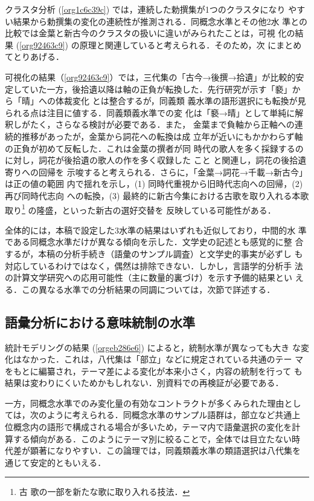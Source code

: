 \documentclass[submit]{ipsj}
\renewcommand{\ref}{\cref}
\begin{document}
クラスタ分析 (\ref{org1c6c39c}) では，連続した勅撰集が1つのクラスタになり
やすい結果から勅撰集の変化の連続性が推測される．同概念水準とその他2水
準との比較では金葉と新古今のクラスタの扱いに違いがみられたことは，可視
化の結果 (\ref{org92463c9}) の原理と関連していると考えられる．そのため，次
にまとめてとりあげる．

可視化の結果（\ref{org92463c9}）では，三代集の「古今→後撰→拾遺」が比較的安
定していた一方，後拾遺以降は軸の正負が転換した．先行研究が示す「褻」か
ら「晴」への体裁変化 \cite{ueno1976Koshui} とは整合するが，同義類
義水準の語形選択にも転換が見られる点は注目に値する．同義類義水準での変
化は「褻→晴」として単純に解釈しがたく，さらなる検討が必要である．また，
金葉まで負軸から正軸への連続的推移があったが，金葉から詞花への転換は成
立年が近いにもかかわらず軸の正負が初めて反転した．これは金葉の撰者が同
時代の歌人を多く採録するのに対し，詞花が後拾遺の歌人の作を多く収録した
こと \cite{matsuda1939Shika} と関連し，詞花の後拾遺寄りへの回帰を
示唆すると考えられる．さらに，「金葉→詞花→千載→新古今」は正の値の範囲
内で揺れを示し，(1) 同時代重視から旧時代志向への回帰，(2) 再び同時代志向
への転換，(3) 最終的に新古今集における古歌を取り入れる本歌取り\footnote{古
歌の一部を新たな歌に取り入れる技法．} の隆盛，といった新古の選好交替を
反映している可能性がある．

全体的には，本稿で設定した3水準の結果はいずれも近似しており，中間的水
準である同概念水準だけが異なる傾向を示した．文学史の記述とも感覚的に整
合するが，本稿の分析手続き（語彙のサンプル調査）と文学史的事実が必ずし
も対応しているわけではなく，偶然は排除できない．しかし，言語学的分析手
法の計算文学研究への応用可能性（主に数量的裏づけ）を示す予備的結果とい
える．この異なる水準での分析結果の同調については，次節で詳述する．
\subsection{語彙分析における意味統制の水準\label{org1d61047}}
\label{sec:org5d75da3}
統計モデリングの結果 (\ref{orgeb286e6}) によると，統制水準が異なっても大き
な変化はなかった．これは，八代集は「部立」などに規定されている共通のテー
マをもとに編纂され，テーマ差による変化が本来小さく，内容の統制を行って
も結果は変わりにくいためかもしれない．別資料での再検証が必要である．

一方，同概念水準でのみ変化量の有効なコントラクトが多くみられた理由とし
ては，次のように考えられる．同概念水準のサンプル語群は，部立など共通上
位概念内の語形で構成される場合が多いため，テーマ内で語彙選択の変化を計
算する傾向がある．このようにテーマ別に絞ることで，全体では目立たない時
代差が顕著になりやすい．この論理では，同義類義水準の類語選択は八代集を
通じて安定的ともいえる．
\end{document}
